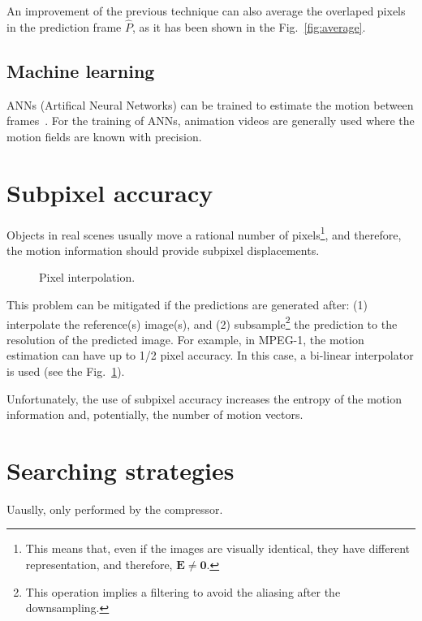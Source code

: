An improvement of the previous technique can also average the
overlaped pixels in the prediction frame $\hat{P}$, as it has been
shown in the Fig.~\ref{fig:average}.


\subsection{Machine learning}

ANNs (Artifical Neural Networks) can be trained to estimate the motion
between frames~\cite{dosovitskiy2015flownet}. For the training of
ANNs, animation videos are generally used where the motion fields are
known with precision.


\section{Subpixel accuracy}

Objects in real scenes usually move a rational number of
pixels\footnote{This means that, even if the images are visually
  identical, they have different representation, and therefore,
  ${\mathbf E}\ne{\mathbf 0}$.}, and therefore, the motion information
should provide subpixel displacements.

\begin{figure}
  \caption{Pixel interpolation.}
  \label{fig:interpolation}
\end{figure}

This problem can be mitigated if the predictions are generated after:
(1) interpolate the reference(s) image(s), and (2)
subsample\footnote{This operation implies a filtering to avoid the
  aliasing after the downsampling.} the prediction to the resolution
of the predicted image. For example, in MPEG-1, the motion estimation
can have up to 1/2 pixel accuracy. In this case, a bi-linear
interpolator is used (see the Fig.~\ref{fig:interpolation}).

Unfortunately, the use of subpixel accuracy increases
the entropy of the motion information and, potentially, the number of
motion vectors.


\section{Searching strategies}

Uauslly, only performed by the compressor.


